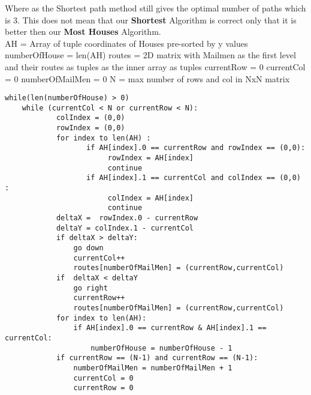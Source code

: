 \documentclass[11pt]{article}
\begin{document}
\hfill \break
\break
Where as the Shortest path method still gives the optimal number of paths which is 3. This does not mean that our  \textbf{Shortest} Algorithm is correct only that it is better then our \textbf{Most Houses} Algorithm.
\hfill \break
\break
\\
\newpage
\hfill \break
\break
AH = Array of tuple coordinates of Houses pre-sorted by y values
\newline
numberOfHouse = len(AH)
\newline
routes =  2D matrix with Mailmen as the first level and their routes as tuples as the inner array as tuples
\newline
currentRow = 0
\newline
currentCol = 0
\newline
numberOfMailMen = 0
\newline
N =  max number of rows and col in NxN matrix
\begin{lstlisting}
while(len(numberOfHouse) > 0)
    while (currentCol < N or currentRow < N):
            colIndex = (0,0)
            rowIndex = (0,0)
            for index to len(AH) :
                   if AH[index].0 == currentRow and rowIndex == (0,0):
                        rowIndex = AH[index]
                        continue
                   if AH[index].1 == currentCol and colIndex == (0,0) :
                        colIndex = AH[index]
                        continue
            deltaX =  rowIndex.0 - currentRow
            deltaY = colIndex.1 - currentCol
            if deltaX > deltaY:
                go down
                currentCol++
                routes[numberOfMailMen] = (currentRow,currentCol)
            if  deltaX < deltaY
                go right
                currentRow++
                routes[numberOfMailMen] = (currentRow,currentCol)
            for index to len(AH):
                if AH[index].0 == currentRow & AH[index].1 == currentCol:
                    numberOfHouse = numberOfHouse - 1
            if currentRow == (N-1) and currentRow == (N-1):
                numberOfMailMen = numberOfMailMen + 1
                currentCol = 0
                currentRow = 0
                
            



        
        
           
            
            
                
                
    
\end{lstlisting}
\end{document}
